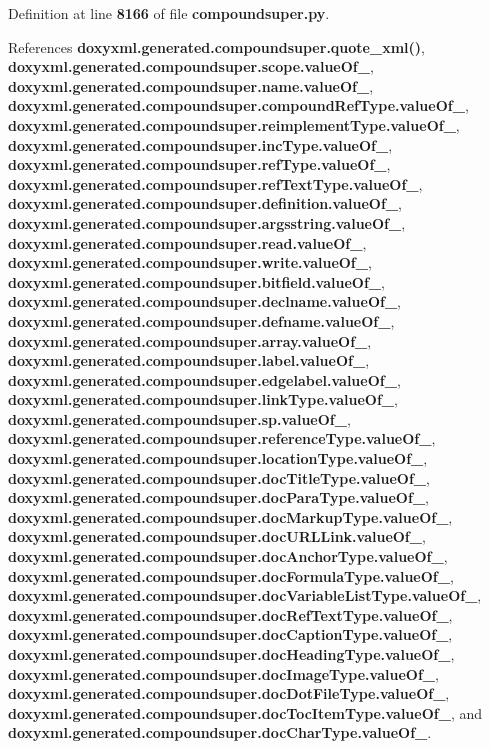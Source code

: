 Definition at line {\bf 8166} of file {\bf compoundsuper.\+py}.



References {\bf doxyxml.\+generated.\+compoundsuper.\+quote\+\_\+xml()}, {\bf doxyxml.\+generated.\+compoundsuper.\+scope.\+value\+Of\+\_\+}, {\bf doxyxml.\+generated.\+compoundsuper.\+name.\+value\+Of\+\_\+}, {\bf doxyxml.\+generated.\+compoundsuper.\+compound\+Ref\+Type.\+value\+Of\+\_\+}, {\bf doxyxml.\+generated.\+compoundsuper.\+reimplement\+Type.\+value\+Of\+\_\+}, {\bf doxyxml.\+generated.\+compoundsuper.\+inc\+Type.\+value\+Of\+\_\+}, {\bf doxyxml.\+generated.\+compoundsuper.\+ref\+Type.\+value\+Of\+\_\+}, {\bf doxyxml.\+generated.\+compoundsuper.\+ref\+Text\+Type.\+value\+Of\+\_\+}, {\bf doxyxml.\+generated.\+compoundsuper.\+definition.\+value\+Of\+\_\+}, {\bf doxyxml.\+generated.\+compoundsuper.\+argsstring.\+value\+Of\+\_\+}, {\bf doxyxml.\+generated.\+compoundsuper.\+read.\+value\+Of\+\_\+}, {\bf doxyxml.\+generated.\+compoundsuper.\+write.\+value\+Of\+\_\+}, {\bf doxyxml.\+generated.\+compoundsuper.\+bitfield.\+value\+Of\+\_\+}, {\bf doxyxml.\+generated.\+compoundsuper.\+declname.\+value\+Of\+\_\+}, {\bf doxyxml.\+generated.\+compoundsuper.\+defname.\+value\+Of\+\_\+}, {\bf doxyxml.\+generated.\+compoundsuper.\+array.\+value\+Of\+\_\+}, {\bf doxyxml.\+generated.\+compoundsuper.\+label.\+value\+Of\+\_\+}, {\bf doxyxml.\+generated.\+compoundsuper.\+edgelabel.\+value\+Of\+\_\+}, {\bf doxyxml.\+generated.\+compoundsuper.\+link\+Type.\+value\+Of\+\_\+}, {\bf doxyxml.\+generated.\+compoundsuper.\+sp.\+value\+Of\+\_\+}, {\bf doxyxml.\+generated.\+compoundsuper.\+reference\+Type.\+value\+Of\+\_\+}, {\bf doxyxml.\+generated.\+compoundsuper.\+location\+Type.\+value\+Of\+\_\+}, {\bf doxyxml.\+generated.\+compoundsuper.\+doc\+Title\+Type.\+value\+Of\+\_\+}, {\bf doxyxml.\+generated.\+compoundsuper.\+doc\+Para\+Type.\+value\+Of\+\_\+}, {\bf doxyxml.\+generated.\+compoundsuper.\+doc\+Markup\+Type.\+value\+Of\+\_\+}, {\bf doxyxml.\+generated.\+compoundsuper.\+doc\+U\+R\+L\+Link.\+value\+Of\+\_\+}, {\bf doxyxml.\+generated.\+compoundsuper.\+doc\+Anchor\+Type.\+value\+Of\+\_\+}, {\bf doxyxml.\+generated.\+compoundsuper.\+doc\+Formula\+Type.\+value\+Of\+\_\+}, {\bf doxyxml.\+generated.\+compoundsuper.\+doc\+Variable\+List\+Type.\+value\+Of\+\_\+}, {\bf doxyxml.\+generated.\+compoundsuper.\+doc\+Ref\+Text\+Type.\+value\+Of\+\_\+}, {\bf doxyxml.\+generated.\+compoundsuper.\+doc\+Caption\+Type.\+value\+Of\+\_\+}, {\bf doxyxml.\+generated.\+compoundsuper.\+doc\+Heading\+Type.\+value\+Of\+\_\+}, {\bf doxyxml.\+generated.\+compoundsuper.\+doc\+Image\+Type.\+value\+Of\+\_\+}, {\bf doxyxml.\+generated.\+compoundsuper.\+doc\+Dot\+File\+Type.\+value\+Of\+\_\+}, {\bf doxyxml.\+generated.\+compoundsuper.\+doc\+Toc\+Item\+Type.\+value\+Of\+\_\+}, and {\bf doxyxml.\+generated.\+compoundsuper.\+doc\+Char\+Type.\+value\+Of\+\_\+}.



